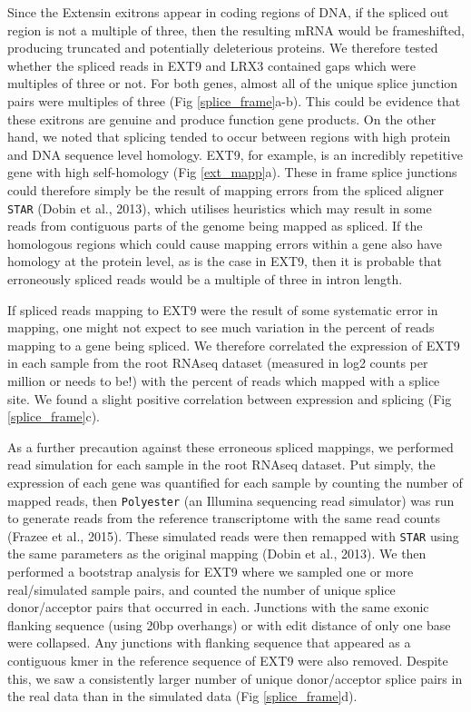 \documentclass[12pt,a4paper,]{report}
\begin{document}
\newpage

Since the Extensin exitrons appear in coding regions of DNA, if the
spliced out region is not a multiple of three, then the resulting mRNA
would be frameshifted, producing truncated and potentially deleterious
proteins. We therefore tested whether the spliced reads in EXT9 and LRX3
contained gaps which were multiples of three or not. For both genes,
almost all of the unique splice junction pairs were multiples of three
(Fig \ref{splice_frame}a-b). This could be evidence that these exitrons
are genuine and produce function gene products. On the other hand, we
noted that splicing tended to occur between regions with high protein
and DNA sequence level homology. EXT9, for example, is an incredibly
repetitive gene with high self-homology (Fig \ref{ext_mapp}a). These in
frame splice junctions could therefore simply be the result of mapping
errors from the spliced aligner \texttt{STAR} (Dobin et al., 2013),
which utilises heuristics which may result in some reads from contiguous
parts of the genome being mapped as spliced. If the homologous regions
which could cause mapping errors within a gene also have homology at the
protein level, as is the case in EXT9, then it is probable that
erroneously spliced reads would be a multiple of three in intron length.

If spliced reads mapping to EXT9 were the result of some systematic
error in mapping, one might not expect to see much variation in the
percent of reads mapping to a gene being spliced. We therefore
correlated the expression of EXT9 in each sample from the root RNAseq
dataset (measured in log2 counts per million or needs to be!) with the
percent of reads which mapped with a splice site. We found a slight
positive correlation between expression and splicing (Fig
\ref{splice_frame}c).

As a further precaution against these erroneous spliced mappings, we
performed read simulation for each sample in the root RNAseq dataset.
Put simply, the expression of each gene was quantified for each sample
by counting the number of mapped reads, then \texttt{Polyester} (an
Illumina sequencing read simulator) was run to generate reads from the
reference transcriptome with the same read counts (Frazee et al., 2015).
These simulated reads were then remapped with \texttt{STAR} using the
same parameters as the original mapping (Dobin et al., 2013). We then
performed a bootstrap analysis for EXT9 where we sampled one or more
real/simulated sample pairs, and counted the number of unique splice
donor/acceptor pairs that occurred in each. Junctions with the same
exonic flanking sequence (using 20bp overhangs) or with edit distance of
only one base were collapsed. Any junctions with flanking sequence that
appeared as a contiguous kmer in the reference sequence of EXT9 were
also removed. Despite this, we saw a consistently larger number of
unique donor/acceptor splice pairs in the real data than in the
simulated data (Fig \ref{splice_frame}d).
\end{document}
